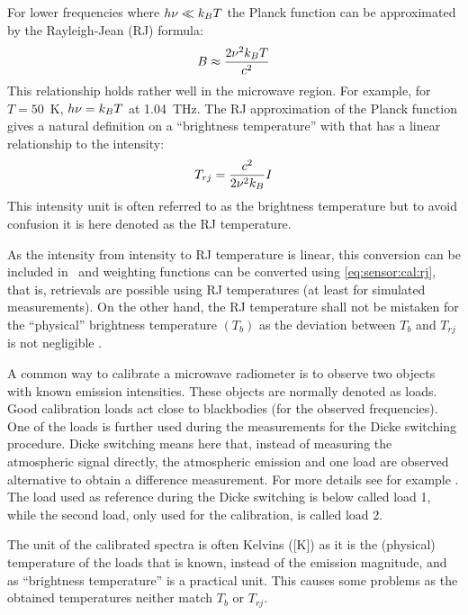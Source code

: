 For lower frequencies where $h\nu \ll k_BT$ the Planck function can
 be approximated by the Rayleigh-Jean (RJ) formula:
 \begin{equation}
   B \approx \frac{2\nu^2k_BT}{c^2}
 \end{equation}
 This relationship holds rather well in the microwave region. For example,
 for $T=50$~K, $h\nu = k_BT$ at 1.04~THz. The RJ approximation of the Planck
 function gives a natural definition on a ``brightness temperature'' with
 that has a linear relationship to the intensity:
 \begin{equation}
   T_{rj} = \frac{c^2}{2\nu^2k_B} I
   \label{eq:sensor:cal:rj}
 \end{equation}
 This intensity unit is often referred to as the brightness temperature but
 to avoid confusion it is here denoted as the RJ temperature.
 
 As the intensity from intensity to RJ temperature is linear, this
 conversion can be included in \Hm\ and weighting functions can be
 converted using \ref{eq:sensor:cal:rj}, that is, retrievals are
 possible using RJ temperatures (at least for simulated measurements).
 On the other hand, the RJ temperature shall not be mistaken for the
 ``physical'' brightness temperature $(T_b)$ as the deviation between
 $T_b$ and $T_{rj}$ is not negligible \citep{eriksson:97a}.


 \label{sec:sensor:cal:loadswitch}
 
 A common way to calibrate a microwave radiometer is to observe two
 objects with known emission intensities. These objects are normally
 denoted as loads. Good calibration loads act close to blackbodies
 (for the observed frequencies). One of the loads is further used
 during the measurements for the Dicke switching procedure. Dicke switching
 means here that, instead of measuring the atmospheric signal
 directly, the atmospheric emission and one load are observed
 alternative to obtain a difference measurement. For more details see
 for example \citet{janssen:93}. The load used as reference during the
 Dicke switching is below called load 1, while the second load, only
 used for the calibration, is called load 2.  
 
 The unit of the calibrated spectra is often Kelvins ([K]) as it is
 the (physical) temperature of the loads that is known, instead of the
 emission magnitude, and as ``brightness temperature'' is a practical
 unit. This causes some problems as the obtained temperatures neither
 match $T_b$ or $T_{rj}$.

